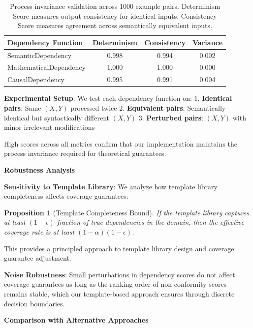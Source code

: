 \documentclass{uai2026} %
\theoremstyle{remark}
\theoremstyle{plain}
\newtheorem{proposition}[theorem]{Proposition}
\theoremstyle{definition}
\begin{document}
\begin{table}[htb]
\centering
\caption{Process invariance validation across 1000 example pairs. Determinism Score measures output consistency for identical inputs. Consistency Score measures agreement across semantically equivalent inputs.}
\label{tab:process-invariance}
\scriptsize
\begin{tabular}{lccc}
\hline
Dependency Function & Determinism & Consistency & Variance \\
\hline
SemanticDependency & 0.998 & 0.994 & 0.002 \\
MathematicalDependency & 1.000 & 1.000 & 0.000 \\
CausalDependency & 0.995 & 0.991 & 0.004 \\
\hline
\end{tabular}
\end{table}

\textbf{Experimental Setup}: We test each dependency function on:
1. \textbf{Identical pairs}: Same $(X,Y)$ processed twice
2. \textbf{Equivalent pairs}: Semantically identical but syntactically different $(X,Y)$
3. \textbf{Perturbed pairs}: $(X,Y)$ with minor irrelevant modifications

High scores across all metrics confirm that our implementation maintains the process invariance required for theoretical guarantees.

\textbf{Robustness Analysis}

\textbf{Sensitivity to Template Library}: We analyze how template library completeness affects coverage guarantees:

\begin{proposition}[Template Completeness Bound]
\label{prop:template-completeness}
If the template library captures at least $(1-\epsilon)$ fraction of true dependencies in the domain, then the effective coverage rate is at least $(1-\alpha)(1-\epsilon)$.
\end{proposition}

This provides a principled approach to template library design and coverage guarantee adjustment.

\textbf{Noise Robustness}: Small perturbations in dependency scores do not affect coverage guarantees as long as the ranking order of non-conformity scores remains stable, which our template-based approach ensures through discrete decision boundaries.

\textbf{Comparison with Alternative Approaches}
\end{document}
